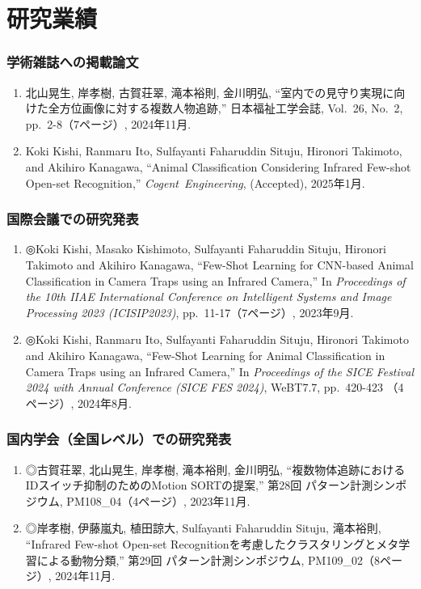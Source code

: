 
\chapter*{研究業績}

\subsection*{学術雑誌への掲載論文}
\begin{enumerate}
  \item 北山晃生, 岸孝樹, 古賀荘翠, 滝本裕則, 金川明弘, ``室内での見守り実現に向けた全方位画像に対する複数人物追跡,'' 日本福祉工学会誌, Vol.~26, No.~2, pp.~2-8（7ページ）, 2024年11月.
  \item Koki Kishi, Ranmaru Ito, Sulfayanti Faharuddin Situju, Hironori Takimoto, and Akihiro Kanagawa, ``Animal Classification Considering Infrared Few-shot Open-set Recognition,'' \mbox{\textit{Cogent Engineering}}, (Accepted), 2025年1月.
\end{enumerate}

\subsection*{国際会議での研究発表}
\begin{enumerate}
  \item ◎Koki Kishi, Masako Kishimoto, Sulfayanti Faharuddin Situju, Hironori Takimoto and Akihiro Kanagawa, ``Few-Shot Learning for CNN-based Animal Classification in Camera Traps using an Infrared Camera,'' In \textit{Proceedings of the 10th IIAE International Conference on Intelligent Systems and Image Processing 2023 (ICISIP2023)}, pp.~11-17（7ページ）, 2023年9月.
  \item ◎Koki Kishi, Ranmaru Ito, Sulfayanti Faharuddin Situju, Hironori Takimoto and Akihiro Kanagawa, ``Few-Shot Learning for Animal Classification in Camera Traps using an Infrared Camera,'' In \textit{Proceedings of the SICE Festival 2024 with Annual Conference (SICE FES 2024)}, WeBT7.7, pp.~420-423 （4ページ）, 2024年8月.
\end{enumerate}

\subsection*{国内学会（全国レベル）での研究発表}
\begin{enumerate}
  \item ◎古賀荘翠, 北山晃生, 岸孝樹, 滝本裕則, 金川明弘, ``複数物体追跡におけるIDスイッチ抑制のためのMotion SORTの提案,'' 第28回 パターン計測シンポジウム, PM108\_04（4ページ）, 2023年11月.
  \item ◎岸孝樹, 伊藤嵐丸, 植田諒大, Sulfayanti Faharuddin Situju, 滝本裕則, ``Infrared Few-shot Open-set Recognitionを考慮したクラスタリングとメタ学習による動物分類,'' 第29回 パターン計測シンポジウム, PM109\_02（8ページ）, 2024年11月.
\end{enumerate}

